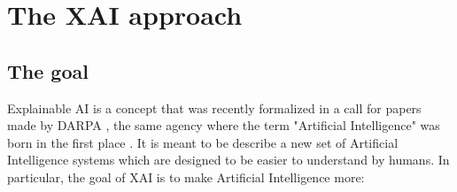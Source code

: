 \documentclass[conference]{IEEEtran}
\newcommand{\cit}[1][]{\todo[tickmarkheight=0.2cm]{cit #1}}
\begin{document}




\section{The XAI approach}
\label{sec:xai}

\subsection{The goal}

Explainable AI is a concept that was recently formalized in a call for papers
 made by DARPA \cit, the
same agency where the term "Artificial Intelligence" was born in the first place
\cit. It is meant to be describe a new set of Artificial Intelligence systems
which are designed to be easier to understand by humans. In particular, the
goal of XAI is to make Artificial Intelligence more:
\end{document}
